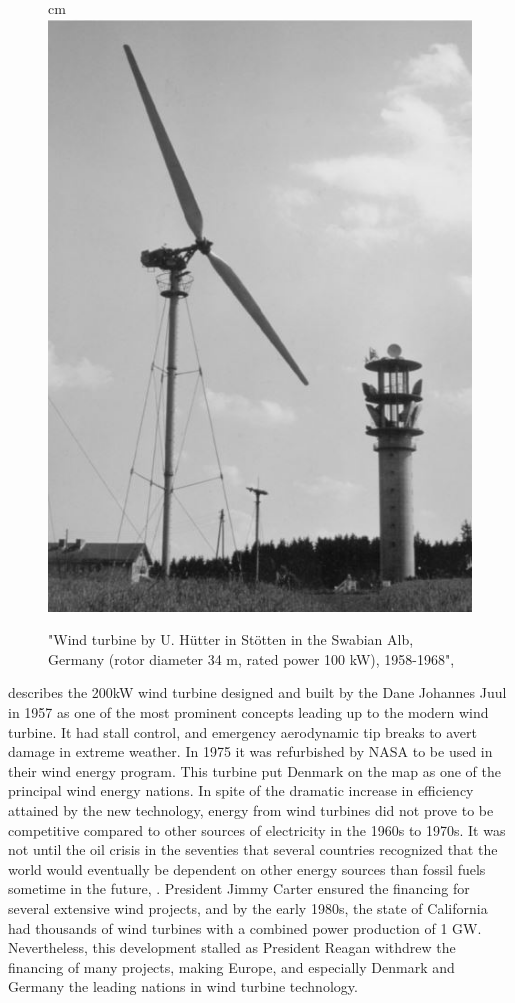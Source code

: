 \newline
\begin{figure}
     cm 
    \centering
    \includegraphics[scale=0.6]{figures/hutter}
\caption[$\; \:$Hûtter Wind Turbine Concept]{"Wind turbine by U. Hütter in Stötten in the Swabian Alb, Germany (rotor diameter 34 m, rated power 100 kW), 1958-1968", \cite{Hau2013} }
 \label{fig:hutter}
\end{figure}
\noindent \cite{Lynn2011} describes the 200kW wind turbine designed and built by the Dane Johannes Juul in 1957 as one of the most prominent concepts leading up to the modern wind turbine. It had stall control, and emergency aerodynamic tip breaks to avert damage in extreme weather. In 1975 it was refurbished by NASA to be used in their wind energy program. This turbine put Denmark on the map as one of the principal wind energy nations. 
\newline 
\newline
\noindent In spite of the dramatic increase in efficiency attained by the new technology, energy from wind turbines did not prove to be competitive compared to other sources of electricity in the 1960s to 1970s. It was not until the oil crisis in the seventies that several countries recognized that the world would eventually be dependent on other energy sources than fossil fuels sometime in the future, \cite{Wagner2013}.  President Jimmy Carter ensured the financing for several extensive wind projects, and by the early 1980s, the state of California had thousands of wind turbines with a combined power production of 1 GW. Nevertheless, this development stalled as President Reagan withdrew the financing of many projects, making Europe, and especially Denmark and Germany the leading nations in wind turbine technology. 
